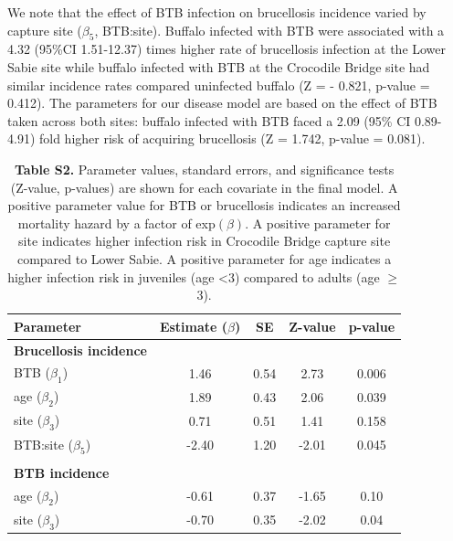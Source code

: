 \documentclass[11pt]{article}
\begin{document}
 We note that the effect of BTB infection on brucellosis incidence varied by capture site ($\beta_5$, BTB:site). Buffalo infected with BTB were associated with a 4.32 (95\%CI 1.51-12.37) times higher rate of brucellosis infection at the Lower Sabie site while buffalo infected with BTB at the Crocodile Bridge site had similar incidence rates compared uninfected buffalo (Z = - 0.821, p-value = 0.412). The parameters for our disease model are based on the effect of BTB taken across both sites: buffalo infected with BTB faced a 2.09 (95\% CI 0.89-4.91) fold higher risk of acquiring brucellosis (Z = 1.742, p-value = 0.081).

\begin{table}[H]
\centering
\caption*{\textbf{Table S2.} Parameter values, standard errors, and significance tests (Z-value, p-values) are shown for each covariate in the final model. A positive parameter value for BTB or brucellosis indicates an increased mortality hazard by a factor of exp$(\beta)$. A positive parameter for site indicates higher infection risk in Crocodile Bridge capture site compared to Lower Sabie. A positive parameter for age indicates a higher infection risk in juveniles (age <3) compared to adults (age $\geq$ 3). }
\newcommand{\head}[1]{\textnormal{\textbf{#1}}}
\normalsize
\begin{tabular}{lcccc} 
\hline
\head{Parameter     } & \head{     Estimate ($\beta$)     } & \head{     SE     } & \head{     Z-value     } & \head{     p-value     } \\*
\hline
\textbf{Brucellosis incidence} & & & & \\
BTB ($\beta_1$) & 1.46 & 0.54 & 2.73 & 0.006 \\
age ($\beta_2$) & 1.89 & 0.43 & 2.06 & 0.039\\
site ($\beta_3$) & 0.71 & 0.51 & 1.41 & 0.158 \\
BTB:site ($\beta_5$) & -2.40 & 1.20 & -2.01 & 0.045 \\
 & & & & \\
\textbf{BTB incidence}  & & & & \\
age ($\beta_2$) & -0.61 & 0.37 & -1.65 & 0.10 \\
site ($\beta_3$) & -0.70 & 0.35 & -2.02 & 0.04\\
\hline 
\end{tabular}
\end{table} 
\end{document}

